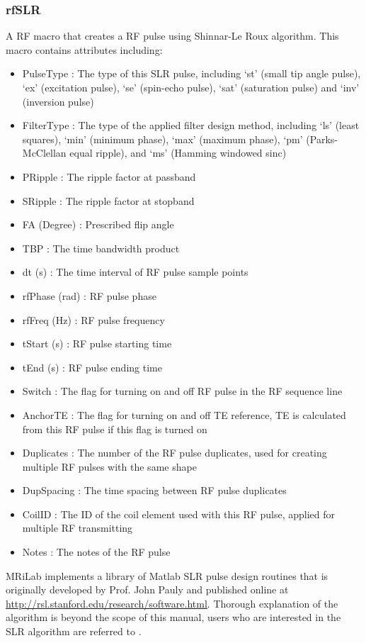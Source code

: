 \documentclass{book}%
\begin{document}
\subsubsection{rfSLR}

A RF macro that creates a RF pulse using Shinnar-Le Roux algorithm. This macro contains attributes including:

\begin{itemize}
	\item PulseType : The type of this SLR pulse, including `st' (small tip angle pulse), `ex' (excitation pulse), `se' (spin-echo pulse), `sat' (saturation pulse) and `inv' (inversion pulse)
	\item FilterType : The type of the applied filter design method, including `ls' (least squares), `min' (minimum phase), `max' (maximum phase), `pm' (Parks-McClellan equal ripple), and `ms' (Hamming windowed sinc)
	\item PRipple : The ripple factor at passband
	\item SRipple : The ripple factor at stopband
	\item FA (Degree) : Prescribed flip angle 
	\item TBP : The time bandwidth product
	\item dt (s) : The time interval of RF pulse sample points
	\item rfPhase (rad) : RF pulse phase
	\item rfFreq (Hz) : RF pulse frequency
	\item tStart (s) : RF pulse starting time
	\item tEnd (s) : RF pulse ending time
	\item Switch : The flag for turning on and off RF pulse in the RF sequence line
	\item AnchorTE : The flag for turning on and off TE reference, TE is calculated from this RF pulse if this flag is turned on
	\item Duplicates : The number of the RF pulse duplicates, used for creating multiple RF pulses with the same shape
	\item DupSpacing : The time spacing between RF pulse duplicates
	\item CoilID : The ID of the coil element used with this RF pulse, applied for multiple RF transmitting
	\item Notes : The notes of the RF pulse 
\end{itemize}

MRiLab implements a library of Matlab SLR pulse design routines that is originally developed by Prof. John Pauly and published online at \url{http://rsl.stanford.edu/research/software.html}. Thorough explanation of the algorithm is beyond the scope of this manual, users who are interested in the SLR algorithm are referred to \cite{Handbook2004,Pauly1991}.
\end{document}
